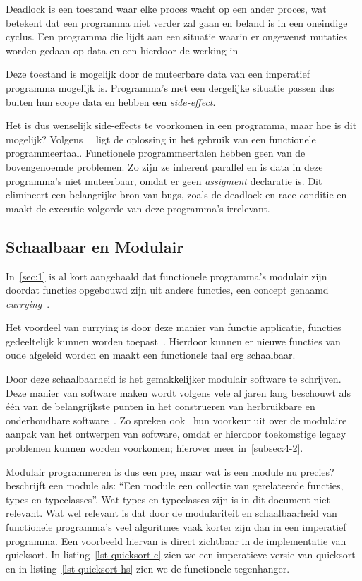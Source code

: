 \documentclass[twoside,twocolumn]{article}
\begin{document}
Deadlock is een toestand waar elke proces wacht op een ander proces, wat
betekent dat een programma niet verder zal gaan en beland is in een oneindige
cyclus. Een programma die lijdt aan een situatie waarin er ongewenst mutaties
worden gedaan op data en een hierdoor de werking in 

Deze toestand is mogelijk  door de muteerbare data van een imperatief
programma mogelijk is. Programma's met een dergelijke situatie passen dus
buiten hun scope data en hebben een \textit{side-effect}.

Het is dus wenselijk side-effects te voorkomen in een programma, maar hoe is
dit mogelijk? Volgens~\citeauthor{src14}~\cite{src14,src15} ligt de oplossing
in het gebruik van een functionele programmeertaal. Functionele
programmeertalen hebben geen van de bovengenoemde problemen. Zo zijn ze
inherent parallel en is data in deze programma's niet muteerbaar, omdat er geen
\textit{assigment} declaratie is. Dit elimineert een belangrijke bron van bugs,
zoals de deadlock en race conditie en maakt de executie volgorde van deze
programma's irrelevant.

\subsection{Schaalbaar en Modulair}
\label{subsec:3-2}

In~\cref{sec:1} is al kort aangehaald dat functionele programma's modulair
zijn doordat functies opgebouwd zijn uit andere functies, een concept genaamd
\textit{currying}~\cite[hfdst.~5]{src16}.

Het voordeel van currying is door deze manier van functie applicatie, functies
gedeeltelijk kunnen worden toepast~\cite{src1}. Hierdoor kunnen er nieuwe
functies van oude afgeleid worden en maakt een functionele taal erg schaalbaar.

Door deze schaalbaarheid is het gemakkelijker modulair software te schrijven.
Deze manier van software maken wordt volgens vele al jaren lang beschouwt als
\'e\'en van de belangrijkste punten in het construeren van herbruikbare en
onderhoudbare software~\cite{src17}. Zo spreken ook~\textcite{src18} hun
voorkeur uit over de modulaire aanpak van het ontwerpen van software, omdat er
hierdoor toekomstige legacy problemen kunnen worden voorkomen; hierover meer
in~\cref{subsec:4-2}.

Modulair programmeren is dus een pre, maar wat is een module nu precies?
\textcite[hdfst.~6]{src16} beschrijft een module als: \enquote{Een module een
collectie van gerelateerde functies, types en typeclasses}. Wat types en
typeclasses zijn is in dit document niet relevant. Wat wel relevant is dat door
de modulariteit en schaalbaarheid van functionele programma's veel algoritmes
vaak korter zijn dan in een imperatief programma. Een voorbeeld hiervan is
direct zichtbaar in de implementatie van quicksort. In
listing~\cref{lst-quicksort-c}  zien we een imperatieve versie van quicksort en
in listing~\cref{lst-quicksort-hs} zien we de functionele tegenhanger. 
\end{document}

